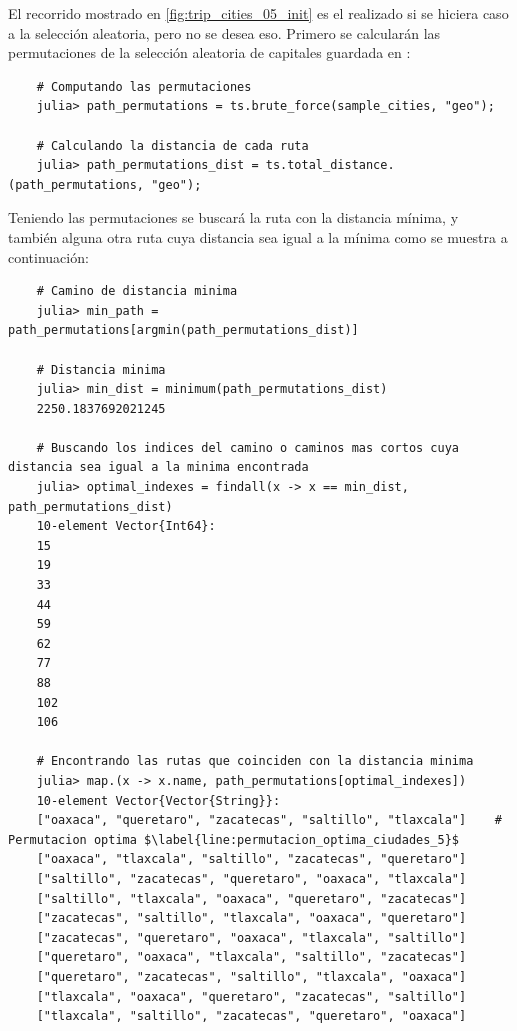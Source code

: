 El recorrido mostrado en \cref{fig:trip_cities_05_init} es el realizado si se hiciera caso a la selección aleatoria, pero no se desea eso. Primero se calcularán las permutaciones de la selección aleatoria de capitales guardada en :
\begin{verbatim}
    # Computando las permutaciones
    julia> path_permutations = ts.brute_force(sample_cities, "geo");

    # Calculando la distancia de cada ruta
    julia> path_permutations_dist = ts.total_distance.(path_permutations, "geo");
\end{verbatim}

Teniendo las permutaciones se buscará la ruta con la distancia mínima, y también alguna otra ruta cuya distancia sea igual a la mínima como se muestra a continuación:
\begin{verbatim}
    # Camino de distancia minima
    julia> min_path = path_permutations[argmin(path_permutations_dist)]

    # Distancia minima
    julia> min_dist = minimum(path_permutations_dist)
    2250.1837692021245

    # Buscando los indices del camino o caminos mas cortos cuya distancia sea igual a la minima encontrada
    julia> optimal_indexes = findall(x -> x == min_dist, path_permutations_dist)
    10-element Vector{Int64}:
    15
    19
    33
    44
    59
    62
    77
    88
    102
    106

    # Encontrando las rutas que coinciden con la distancia minima
    julia> map.(x -> x.name, path_permutations[optimal_indexes])
    10-element Vector{Vector{String}}:
    ["oaxaca", "queretaro", "zacatecas", "saltillo", "tlaxcala"]    # Permutacion optima $\label{line:permutacion_optima_ciudades_5}$
    ["oaxaca", "tlaxcala", "saltillo", "zacatecas", "queretaro"]
    ["saltillo", "zacatecas", "queretaro", "oaxaca", "tlaxcala"]
    ["saltillo", "tlaxcala", "oaxaca", "queretaro", "zacatecas"]
    ["zacatecas", "saltillo", "tlaxcala", "oaxaca", "queretaro"]
    ["zacatecas", "queretaro", "oaxaca", "tlaxcala", "saltillo"]
    ["queretaro", "oaxaca", "tlaxcala", "saltillo", "zacatecas"]
    ["queretaro", "zacatecas", "saltillo", "tlaxcala", "oaxaca"]
    ["tlaxcala", "oaxaca", "queretaro", "zacatecas", "saltillo"]
    ["tlaxcala", "saltillo", "zacatecas", "queretaro", "oaxaca"]
\end{verbatim}

